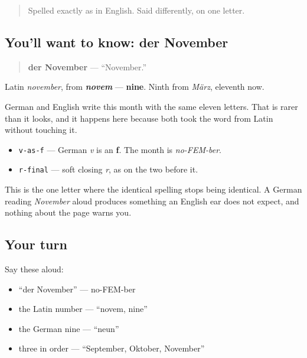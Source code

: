 \label{lesson:GE-C09-november}



\begin{quote}
Spelled exactly as in English. Said differently, on one letter.
\end{quote}

\subsection*{You'll want to know: der November}
\begin{quote}
\textbf{der November} — \textquotedblleft{}November.\textquotedblright{}
\end{quote}

Latin \emph{november}, from \emph{\textbf{novem}} — \textbf{nine}. Ninth from \emph{März}, eleventh now.

German and English write this month with the same eleven letters. That is rarer than it looks, and it happens here because both took the word from Latin without touching it.

\begin{sounds}
\begin{itemize}
\raggedright
  \item \texttt{v-as-f} — German \emph{v} is an \textbf{f}. The month is \emph{no-FEM-ber}.
  \item \texttt{r-final} — soft closing \emph{r}, as on the two before it.
\end{itemize}

This is the one letter where the identical spelling stops being identical. A German reading \emph{November} aloud produces something an English ear does not expect, and nothing about the page warns you.
\end{sounds}

\subsection*{Your turn}
Say these aloud:

\begin{itemize}
\raggedright
  \item \textquotedblleft{}der November\textquotedblright{} — no-FEM-ber
  \item the Latin number — \textquotedblleft{}novem, nine\textquotedblright{}
  \item the German nine — \textquotedblleft{}neun\textquotedblright{}
  \item three in order — \textquotedblleft{}September, Oktober, November\textquotedblright{}
\end{itemize}

